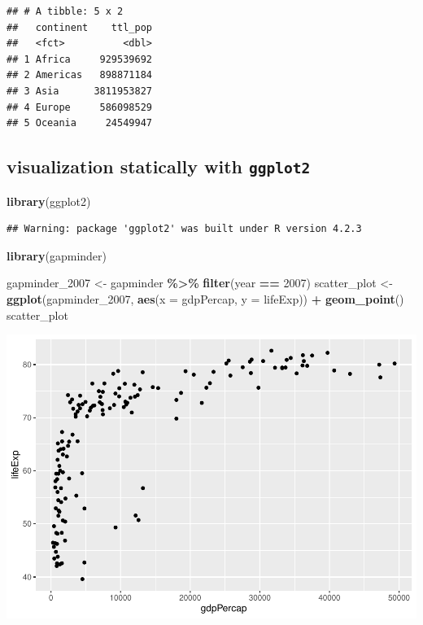 \documentclass[
]{book}
\newenvironment{Shaded}{\begin{snugshade}}{\end{snugshade}}
\newcommand{\AttributeTok}[1]{\textcolor[rgb]{0.13,0.29,0.53}{#1}}
\newcommand{\DecValTok}[1]{\textcolor[rgb]{0.00,0.00,0.81}{#1}}
\newcommand{\FunctionTok}[1]{\textcolor[rgb]{0.13,0.29,0.53}{\textbf{#1}}}
\newcommand{\NormalTok}[1]{#1}
\newcommand{\OtherTok}[1]{\textcolor[rgb]{0.56,0.35,0.01}{#1}}
\newcommand{\SpecialCharTok}[1]{\textcolor[rgb]{0.81,0.36,0.00}{\textbf{#1}}}
\theoremstyle{definition}
\theoremstyle{definition}
\theoremstyle{definition}
\theoremstyle{definition}
\theoremstyle{remark}
\begin{document}
\begin{verbatim}
## # A tibble: 5 x 2
##   continent    ttl_pop
##   <fct>          <dbl>
## 1 Africa     929539692
## 2 Americas   898871184
## 3 Asia      3811953827
## 4 Europe     586098529
## 5 Oceania     24549947
\end{verbatim}

\subsection{\texorpdfstring{visualization statically with \texttt{ggplot2}}{visualization statically with ggplot2}}\label{visualization-statically-with-ggplot2}

\begin{Shaded}
\begin{Highlighting}[]
\FunctionTok{library}\NormalTok{(ggplot2)}
\end{Highlighting}
\end{Shaded}

\begin{verbatim}
## Warning: package 'ggplot2' was built under R version 4.2.3
\end{verbatim}

\begin{Shaded}
\begin{Highlighting}[]
\FunctionTok{library}\NormalTok{(gapminder)}

\NormalTok{gapminder\_2007 }\OtherTok{\textless{}{-}}\NormalTok{ gapminder }\SpecialCharTok{\%\textgreater{}\%}
  \FunctionTok{filter}\NormalTok{(year }\SpecialCharTok{==} \DecValTok{2007}\NormalTok{)}
\NormalTok{scatter\_plot }\OtherTok{\textless{}{-}} \FunctionTok{ggplot}\NormalTok{(gapminder\_2007, }\FunctionTok{aes}\NormalTok{(}\AttributeTok{x =}\NormalTok{ gdpPercap, }\AttributeTok{y =}\NormalTok{ lifeExp)) }\SpecialCharTok{+}
  \FunctionTok{geom\_point}\NormalTok{()}
\NormalTok{scatter\_plot}
\end{Highlighting}
\end{Shaded}

\includegraphics{202402211401-R_files/figure-latex/unnamed-chunk-19-1.pdf}
\end{document}
